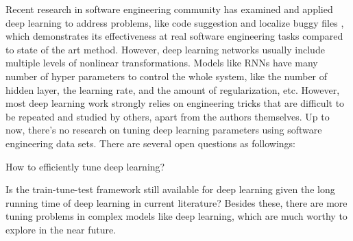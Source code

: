 Recent research in software engineering community has examined and applied deep learning to address problems, like code suggestion \cite{white2015toward} and localize buggy files \cite{lam2015combining}, which demonstrates its effectiveness at real software engineering tasks compared to state of the art method. However, deep learning networks usually include multiple levels of nonlinear transformations\cite{bengio2009learning}. Models like RNNs have many number of hyper parameters to control the whole system, like the number of hidden layer, the learning rate, and the amount of regularization, etc. However, most deep learning work strongly relies on engineering tricks that are difficult to be repeated and studied by others, apart from the authors themselves\cite{zhou2014big}. Up to now, there's no research on tuning deep learning parameters using software engineering data sets. There are several open questions as followings:
\bi
\item How to efficiently tune deep learning? 
\item Is the train-tune-test framework still available for deep learning given the long running time of deep learning in current literature?
\ei
Besides these, there are more tuning problems in complex models like deep learning, which 
are much worthy to explore in the near future.